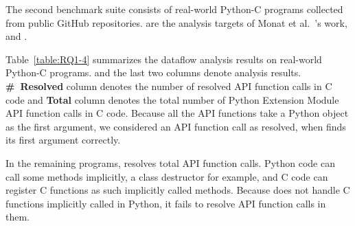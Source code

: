 

The second benchmark suite consists of  real-world Python-C programs
collected from public GitHub repositories.  are the analysis
targets of Monat et al.~\cite{sas2021}'s work, and .

Table~\ref{table:RQ1-4} summarizes the dataflow analysis results on 
real-world Python-C programs. 
and the last two columns denote analysis results.
{\bf \#~Resolved} column denotes the number of resolved API function calls in C code and
{\bf Total} column denotes the total number of Python Extension Module API function
calls in C code. 
Because all the API functions take a Python object as the first argument, we
considered an API function call as resolved, when \ours finds its first argument
correctly. 

 
In the remaining  programs, \ours resolves  total
API function calls. 
Python code can call some methods implicitly, a class destructor for example, and C
code can register C functions as such implicitly called methods.
Because \ours does not handle C functions implicitly called in Python, it
fails to resolve API function calls in them.




